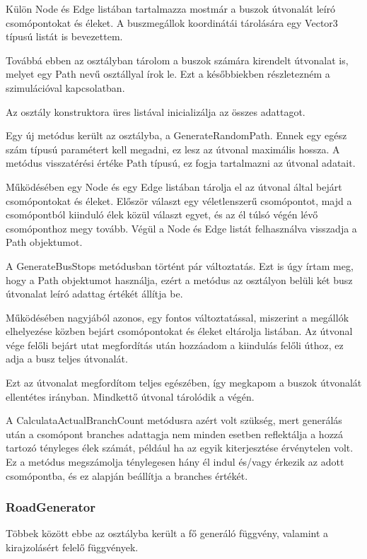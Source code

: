 Külön Node és Edge listában tartalmazza mostmár a buszok útvonalát leíró csomópontokat és éleket. A buszmegállok koordinátái tárolására egy Vector3 típusú listát is bevezettem.

Továbbá ebben az osztályban tárolom a buszok számára kirendelt útvonalat is, melyet egy Path nevű osztállyal írok le. Ezt a későbbiekben részletezném a szimulációval kapcsolatban.

Az osztály konstruktora üres listával inicializálja az összes adattagot.

Egy új metódus került az osztályba, a GenerateRandomPath. Ennek egy egész szám típusú paramétert kell megadni, ez lesz az útvonal maximális hossza. A metódus visszatérési értéke Path típusú, ez fogja tartalmazni az útvonal adatait.

Működésében egy Node és egy Edge listában tárolja el az útvonal által bejárt csomópontokat és éleket. Először választ egy véletlenszerű csomópontot, majd a csomópontból kiinduló élek közül választ egyet, és az él túlsó végén lévő csomóponthoz megy tovább. Végül a Node és Edge listát felhasználva visszadja a Path objektumot.

A GenerateBusStops metódusban történt pár változtatás. Ezt is úgy írtam meg, hogy a Path objektumot használja, ezért a metódus az osztályon belüli két busz útvonalat leíró adattag értékét állítja be.

Működésében nagyjából azonos, egy fontos változtatással, miszerint a megállók elhelyezése közben bejárt csomópontokat és éleket eltárolja listában. Az útvonal vége felőli bejárt utat megfordítás után hozzáadom a kiindulás felőli úthoz, ez adja a busz teljes útvonalát.

Ezt az útvonalat megfordítom teljes egészében, így megkapom a buszok útvonalát ellentétes irányban. Mindkettő útvonal tárolódik a végén.

A CalculataActualBranchCount metódusra azért volt szükség, mert generálás után a csomópont branches adattagja nem minden esetben reflektálja a hozzá tartozó tényleges élek számát, például ha az egyik kiterjesztése érvénytelen volt. Ez a metódus megszámolja ténylegesen hány él indul és/vagy érkezik az adott csomópontba, és ez alapján beállítja a branches értékét.
\subsubsection{RoadGenerator}
Többek között ebbe az osztályba került a fő generáló függvény, valamint a kirajzolásért felelő függvények.

